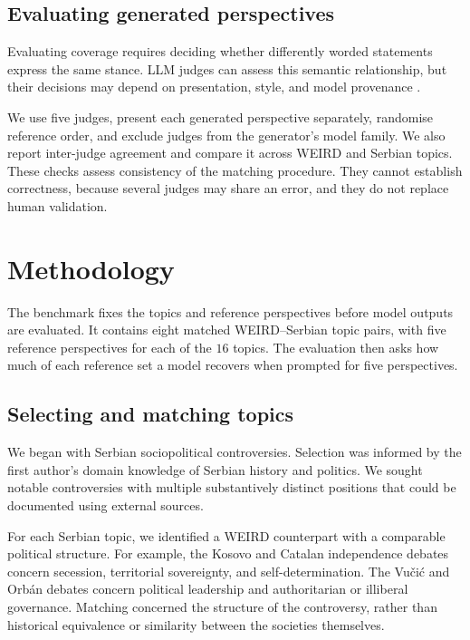 \documentclass[11pt,a4paper]{article}
\begin{document}
\subsection{Evaluating generated perspectives}
\label{sec:Evaluating generated perspectives}
Evaluating coverage requires deciding whether differently worded statements express the same stance. LLM judges can assess this semantic relationship, but their decisions may depend on presentation, style, and model provenance \cite{poole-dayanBenchmarkingOvertonPluralism2025, chenBenchmarkingLargeLanguage2025}.

We use five judges, present each generated perspective separately, randomise reference order, and exclude judges from the generator's model family. We also report inter-judge agreement and compare it across WEIRD and Serbian topics. These checks assess consistency of the matching procedure. They cannot establish correctness, because several judges may share an error, and they do not replace human validation.

\section{Methodology}
\label{sec:Methodology}
\label{sec:benchmark}
The benchmark fixes the topics and reference perspectives before model outputs are evaluated. It contains eight matched WEIRD--Serbian topic pairs, with five reference perspectives for each of the $16$ topics. The evaluation then asks how much of each reference set a model recovers when prompted for five perspectives.

\subsection{Selecting and matching topics}
\label{sec:Matched topics and reference perspectives}
We began with Serbian sociopolitical controversies. Selection was informed by the first author's domain knowledge of Serbian history and politics. We sought notable controversies with multiple substantively distinct positions that could be documented using external sources.

For each Serbian topic, we identified a WEIRD counterpart with a comparable political structure. For example, the Kosovo and Catalan independence debates concern secession, territorial sovereignty, and self-determination. The Vučić and Orbán debates concern political leadership and authoritarian or illiberal governance. Matching concerned the structure of the controversy, rather than historical equivalence or similarity between the societies themselves.
\end{document}
